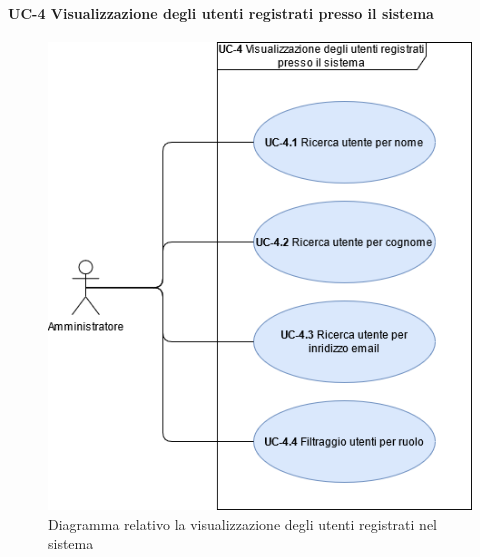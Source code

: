 
\paragraph{UC-4 Visualizzazione degli utenti registrati presso il sistema}
\begin{figure}[H]
    \centering
      \includegraphics[scale=0.50]{src/CasiDUso/immagini/VisualizzazioneUtenti.png}
    \caption{Diagramma relativo la visualizzazione degli utenti registrati nel sistema}
\end{figure}



